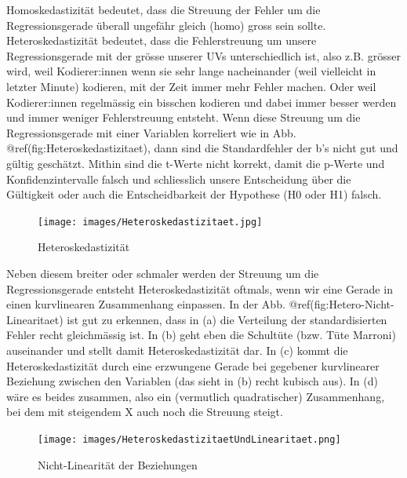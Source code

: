 \documentclass[
  10pt,
  letterpaper,
  a4paper, twoside]{scrreprt}
\begin{document}
Homoskedastizität bedeutet, dass die Streuung der Fehler um die
Regressionsgerade überall ungefähr gleich (homo) gross sein sollte.
Heteroskedastizität bedeutet, dass die Fehlerstreuung um unsere
Regressionsgerade mit der grösse unserer UVs unterschiedlich ist, also
z.B. grösser wird, weil Kodierer:innen wenn sie sehr lange nacheinander
(weil vielleicht in letzter Minute) kodieren, mit der Zeit immer mehr
Fehler machen. Oder weil Kodierer:innen regelmässig ein bisschen
kodieren und dabei immer besser werden und immer weniger Fehlerstreuung
entsteht. Wenn diese Streuung um die Regressionsgerade mit einer
Variablen korreliert wie in Abb. @ref(fig:Heteroskedastizitaet), dann
sind die Standardfehler der b's nicht gut und gültig geschätzt. Mithin
sind die t-Werte nicht korrekt, damit die p-Werte und
Konfidenzintervalle falsch und schliesslich unsere Entscheidung über die
Gültigkeit oder auch die Entscheidbarkeit der Hypothese (H0 oder H1)
falsch.

\begin{figure}[H]

{\centering \texttt{[image: images/Heteroskedastizitaet.jpg]}

}

\caption{Heteroskedastizität}

\end{figure}%

Neben diesem breiter oder schmaler werden der Streuung um die
Regressionsgerade entsteht Heteroskedastizität oftmals, wenn wir eine
Gerade in einen kurvlinearen Zusammenhang einpassen. In der Abb.
@ref(fig:Hetero-Nicht-Linearitaet) ist gut zu erkennen, dass in (a) die
Verteilung der standardisierten Fehler recht gleichmässig ist. In (b)
geht eben die Schultüte (bzw. Tüte Marroni) auseinander und stellt damit
Heteroskedastizität dar. In (c) kommt die Heteroskedastizität durch eine
erzwungene Gerade bei gegebener kurvlinearer Beziehung zwischen den
Variablen (das sieht in (b) recht kubisch aus). In (d) wäre es beides
zusammen, also ein (vermutlich quadratischer) Zusammenhang, bei dem mit
steigendem X auch noch die Streuung steigt.

\begin{figure}[H]

{\centering \texttt{[image: images/HeteroskedastizitaetUndLinearitaet.png]}

}

\caption{Nicht-Linearität der Beziehungen}

\end{figure}%
\end{document}
